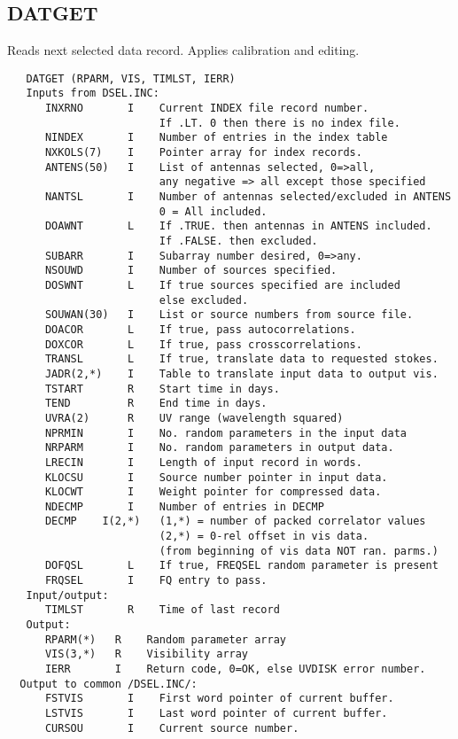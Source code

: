 \subsection{DATGET}
Reads next selected data record. Applies calibration and editing.
\begin{verbatim}
   DATGET (RPARM, VIS, TIMLST, IERR)
   Inputs from DSEL.INC:
      INXRNO       I    Current INDEX file record number.
                        If .LT. 0 then there is no index file.
      NINDEX       I    Number of entries in the index table
      NXKOLS(7)    I    Pointer array for index records.
      ANTENS(50)   I    List of antennas selected, 0=>all,
                        any negative => all except those specified
      NANTSL       I    Number of antennas selected/excluded in ANTENS
                        0 = All included.
      DOAWNT       L    If .TRUE. then antennas in ANTENS included.
                        If .FALSE. then excluded.
      SUBARR       I    Subarray number desired, 0=>any.
      NSOUWD       I    Number of sources specified.
      DOSWNT       L    If true sources specified are included
                        else excluded.
      SOUWAN(30)   I    List or source numbers from source file.
      DOACOR       L    If true, pass autocorrelations.
      DOXCOR       L    If true, pass crosscorrelations.
      TRANSL       L    If true, translate data to requested stokes.
      JADR(2,*)    I    Table to translate input data to output vis.
      TSTART       R    Start time in days.
      TEND         R    End time in days.
      UVRA(2)      R    UV range (wavelength squared)
      NPRMIN       I    No. random parameters in the input data
      NRPARM       I    No. random parameters in output data.
      LRECIN       I    Length of input record in words.
      KLOCSU       I    Source number pointer in input data.
      KLOCWT       I    Weight pointer for compressed data.
      NDECMP       I    Number of entries in DECMP
      DECMP    I(2,*)   (1,*) = number of packed correlator values
                        (2,*) = 0-rel offset in vis data.
                        (from beginning of vis data NOT ran. parms.)
      DOFQSL       L    If true, FREQSEL random parameter is present
      FRQSEL       I    FQ entry to pass.
   Input/output:
      TIMLST       R    Time of last record
   Output:
      RPARM(*)   R    Random parameter array
      VIS(3,*)   R    Visibility array
      IERR       I    Return code, 0=OK, else UVDISK error number.
  Output to common /DSEL.INC/:
      FSTVIS       I    First word pointer of current buffer.
      LSTVIS       I    Last word pointer of current buffer.
      CURSOU       I    Current source number.
\end{verbatim}

